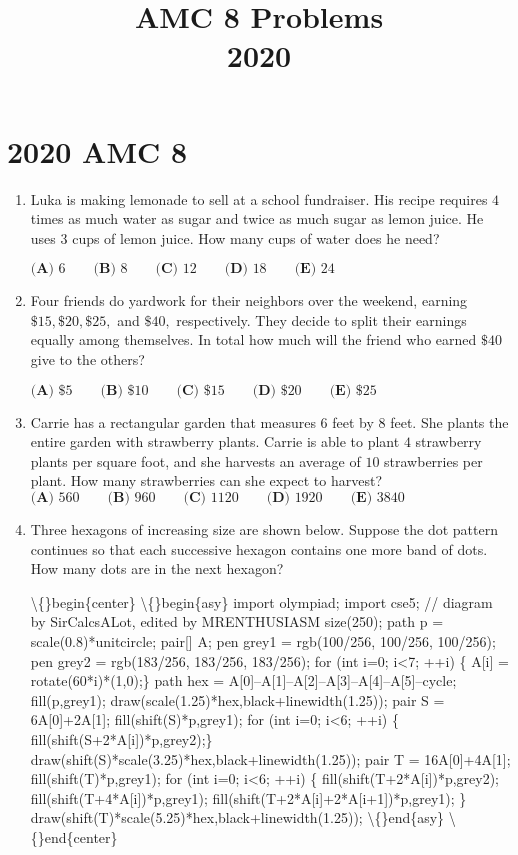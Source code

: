 \documentclass{article}
\title{AMC 8 Problems \\ 2020}
\date{}
\begin{document}
\maketitle\thispagestyle{fancy}\newpage\section*{2020 AMC 8}\begin{enumerate}[label=\arabic*., itemsep=0.5em]\item Luka is making lemonade to sell at a school fundraiser. His recipe requires \(4\) times as much water as sugar and twice as much sugar as lemon juice. He uses \(3\) cups of lemon juice. How many cups of water does he need? 

\(\textbf{(A) } 6\qquad\textbf{(B) } 8\qquad\textbf{(C) } 12\qquad\textbf{(D) } 18\qquad\textbf{(E) } 24\qquad\)\par \vspace{0.5em}\item Four friends do yardwork for their neighbors over the weekend, earning \(\$15, \$20, \$25,\) and \(\$40,\) respectively. They decide to split their earnings equally among themselves. In total how much will the friend who earned \(\$40\) give to the others?

\(\textbf{(A) }\$5 \qquad \textbf{(B) }\$10 \qquad \textbf{(C) }\$15 \qquad \textbf{(D) }\$20 \qquad \textbf{(E) }\$25\)\par \vspace{0.5em}\item Carrie has a rectangular garden that measures \(6\) feet by \(8\) feet. She plants the entire garden with strawberry plants. Carrie is able to plant \(4\) strawberry plants per square foot, and she harvests an average of \(10\) strawberries per plant. How many strawberries can she expect to harvest?
\(\textbf{(A) }560 \qquad \textbf{(B) }960 \qquad \textbf{(C) }1120 \qquad \textbf{(D) }1920 \qquad \textbf{(E) }3840\)\par \vspace{0.5em}\item Three hexagons of increasing size are shown below. Suppose the dot pattern continues so that each successive hexagon contains one more band of dots. How many dots are in the next hexagon?


\textbackslash\{\}begin\{center\}
\textbackslash\{\}begin\{asy\}
import olympiad;
import cse5;
// diagram by SirCalcsALot, edited by MRENTHUSIASM
size(250);
path p = scale(0.8)*unitcircle;
pair[] A;
pen grey1 = rgb(100/256, 100/256, 100/256);
pen grey2 = rgb(183/256, 183/256, 183/256);
for (int i=0; i<7; ++i) \{ A[i] = rotate(60*i)*(1,0);\}
path hex = A[0]--A[1]--A[2]--A[3]--A[4]--A[5]--cycle;
fill(p,grey1);
draw(scale(1.25)*hex,black+linewidth(1.25));
pair S = 6A[0]+2A[1];
fill(shift(S)*p,grey1);
for (int i=0; i<6; ++i) \{ fill(shift(S+2*A[i])*p,grey2);\}
draw(shift(S)*scale(3.25)*hex,black+linewidth(1.25));
pair T = 16A[0]+4A[1];
fill(shift(T)*p,grey1);
for (int i=0; i<6; ++i) \{ 
 fill(shift(T+2*A[i])*p,grey2);
 fill(shift(T+4*A[i])*p,grey1);
 fill(shift(T+2*A[i]+2*A[i+1])*p,grey1);
\}
draw(shift(T)*scale(5.25)*hex,black+linewidth(1.25));
\textbackslash\{\}end\{asy\}
\textbackslash\{\}end\{center\}



\end{enumerate}
\end{document}
